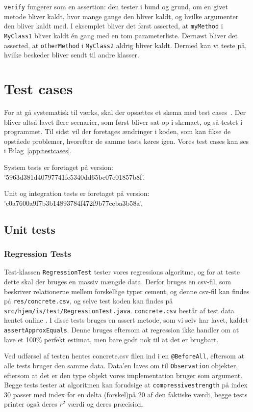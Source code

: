 \texttt{verify} fungerer som en assertion: den tester i bund og grund, om en givet metode bliver kaldt, hvor mange gange den bliver kaldt, og hvilke argumenter den bliver kaldt med. I eksemplet bliver det først asserted, at \texttt{myMethod} i \texttt{MyClass1} bliver kaldt én gang med en tom parameterliste. Dernæst bliver det asserted, at \texttt{otherMethod} i \texttt{MyClass2} aldrig bliver kaldt. Dermed kan vi teste på, hvilke beskeder bliver sendt til andre klasser.

\section{Test cases}
For at gå systematisk til værks, skal der opsættes et skema med test cases~\cite{Heumann}. Der bliver altså lavet flere scenarier, som først bliver sat op i skemaet, og så testet i programmet. Til sidst vil der foretages ændringer i koden, som kan fikse de opståede problemer, hvorefter de samme tests køres igen. Vores test cases kan ses i Bilag~\ref{app:testcases}.

System tests er foretaget på version: '5963d381d40797741fe5340dd65bc07e01857b8f'.

Unit og integration tests er foretaget på version: 'c0a7600a9f7b3b14893784f472f9b77ceba3b58a'.

\subsection{Unit tests}
\subsubsection{Regression Tests}
Test-klassen \texttt{RegressionTest} tester vores regressions algoritme, og for at teste dette skal der bruges en massiv mængde data. Derfor bruges en csv-fil, som beskriver relationerne mellem forskellige typer cement, og denne csv-fil kan findes på \texttt{res/concrete.csv}, og selve test koden kan findes på \texttt{src/hjem/is/test/RegressionTest.java}. \texttt{concrete.csv} består af test data hentet online \cite{ExampleSales}. I disse tests bruges en assert metode, som vi selv har lavet, kaldet \texttt{assertApproxEquals}. Denne bruges eftersom at regression ikke handler om at lave et 100\% perfekt estimat, men bare godt nok til at det er brugbart.

Ved udførsel af testen hentes concrete.csv filen ind i en \texttt{@BeforeAll}, eftersom at alle tests bruger den samme data. Data'en laves om til \texttt{Observation} objekter, eftersom at det er den type objekt vores implementation bruger som argument. Begge tests tester at algoritmen kan forudsige at \texttt{compressivestrength} på index 30 passer med index for en delta (forskel)på 20 af den faktiske værdi, begge tests printer også deres $r^{2}$ værdi og deres præcision.


